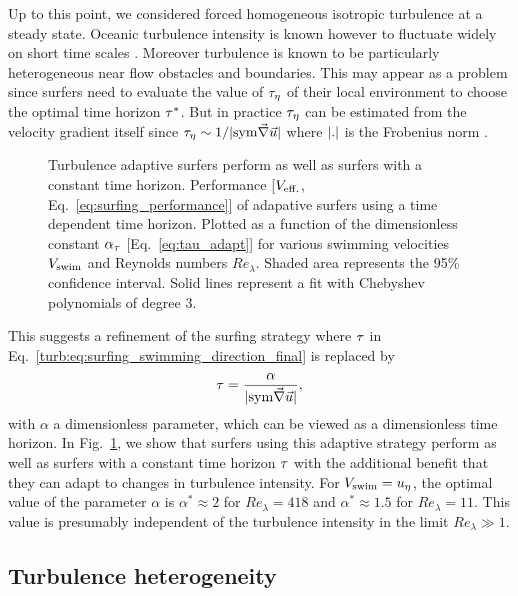 Up to this point, we considered forced homogeneous isotropic turbulence at a steady state.
Oceanic turbulence intensity is known however to fluctuate widely on short time scales \citep{franks2022oceanic}.
Moreover turbulence is known to be particularly heterogeneous near flow obstacles and boundaries.
This may appear as a problem since surfers need to evaluate the value of $\tau_{\eta}$ of their local environment to choose the optimal time horizon $\tau^*$.
But in practice $\tau_{\eta}$ can be estimated from the velocity gradient itself since $\tau_{\eta} \sim 1/\lvert\mathrm{sym} \vec{\nabla} \vec{u}\rvert$ where $\lvert.\rvert$ is the Frobenius norm \citep{yu_lagrangian_2010}.
\begin{figure}%
	\centering
	
	\caption[Turbulence adaptive surfers perform as well as surfers with a constant time horizon.]{
		Turbulence adaptive surfers perform as well as surfers with a constant time horizon.
		Performance [$V_{\mathrm{eff.}}$, Eq.~\eqref{eq:surfing_performance}] of adapative surfers using a time dependent time horizon. Plotted as a function of the dimensionless constant $\alpha_{\tau}$ [Eq.~\eqref{eq:tau_adapt}] for various swimming velocities $V_{\mathrm{swim}}$ and Reynolds numbers $\mathit{Re}_{\lambda}$.
		Shaded area represents the 95\% confidence interval.
		Solid lines represent a fit with Chebyshev polynomials of degree 3.
	}
	\label{fig:surfing_adaptive_surf}
\end{figure}
This suggests a refinement of the surfing strategy where $\tau$ in Eq.~\eqref{turb:eq:surfing_swimming_direction_final} is replaced by
\begin{equation}
	\label{eq:tau_adapt}
	\tau = \frac{\alpha}{\lvert\mathrm{sym} \vec{\nabla} \vec{u}\rvert},
\end{equation}
with $\alpha$ a dimensionless parameter, which can be viewed as a dimensionless time horizon.
In Fig.~\ref{fig:surfing_adaptive_surf}, we show that surfers using this adaptive strategy perform as well as surfers with a constant time horizon $\tau$ with the additional benefit that they can adapt to changes in turbulence intensity.
For $V_{\mathrm{swim}} = u_{\eta}$, the optimal value of the parameter $\alpha$ is $\alpha^* \approx 2$ for $\mathit{Re}_{\lambda} = 418$ and $\alpha^* \approx 1.5$ for $\mathit{Re}_{\lambda} = 11$.
This value is presumably independent of the turbulence intensity in the limit $\mathit{Re}_{\lambda} \gg 1$.

\subsection{Turbulence heterogeneity}\label{sec:num_channel_flow}

